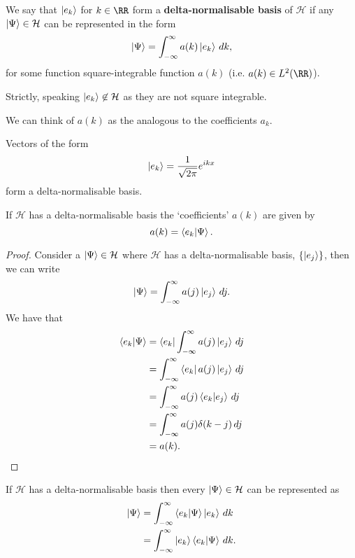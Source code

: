 \documentclass[12pt, a4paper]{article}
\begin{document}
\begin{definition}
    We say that \(\ket{e_k}\) for \(k \in \RR\) form a \textbf{delta-normalisable basis} of \(\mathcal{H}\) if any \(\ket{\Psi} \in \mathcal{H}\) can be represented in the form
    \[\ket{\Psi} = \int_{-\infty}^{\infty} a(k) \ket{e_k} \, dk,\]
    for some function square-integrable function \(a(k)\) (i.e. \(a(k) \in L^2(\RR)\)).
\end{definition}

\begin{mdremark}
    Strictly, speaking \(\ket{e_k} \not\in \mathcal{H}\) as they are not square integrable.
\end{mdremark}

\begin{mdnote}
    We can think of \(a(k)\) as the analogous to the coefficients \(a_k\).
\end{mdnote}

\begin{mdexample}
    Vectors of the form 
    \[\ket{e_k} = \frac{1}{\sqrt{2\pi}} e^{ikx}\]
    form a delta-normalisable basis.
\end{mdexample}

\begin{mdthm}
    If \(\mathcal{H}\) has a delta-normalisable basis the `coefficients' \(a(k)\) are given by 
    \[a(k) = \bra{e_k} \ket{\Psi}.\]
\end{mdthm}

\begin{proof}
    Consider a \(\ket{\Psi} \in \mathcal{H}\) where \(\mathcal{H}\) has a delta-normalisable basis, \(\{\ket{e_j}\}\), then we can write
    \[\ket{\Psi} = \int_{-\infty}^{\infty} a(j) \ket{e_j} \, dj.\]
    We have that 
    \[\begin{aligned}
        \bra{e_k} \ket{\Psi} &= \bra{e_k} \int_{-\infty}^{\infty} a(j) \ket{e_j} \, dj \\
        &= \int_{-\infty}^{\infty} \bra{e_k} a(j) \ket{e_j} \, dj \\
        &= \int_{-\infty}^{\infty} a(j) \bra{e_k}\ket{e_j} \, dj\\
        &= \int_{-\infty}^{\infty} a(j) \delta(k-j) \, dj \\
        &= a(k).
    \end{aligned}\]
\end{proof}

\begin{corollary}
    If \(\mathcal{H}\) has a delta-normalisable basis then every \(\ket{\Psi} \in \mathcal{H}\) can be represented as 
    \[\begin{aligned}
        \ket{\Psi} &= \int_{-\infty}^{\infty} \bra{e_k} \ket{\Psi} \ket{e_k} \, dk \\
        &= \int_{-\infty}^{\infty} \ket{e_k} \bra{e_k} \ket{\Psi} \, dk.
    \end{aligned}\]
\end{corollary}
\end{document}
